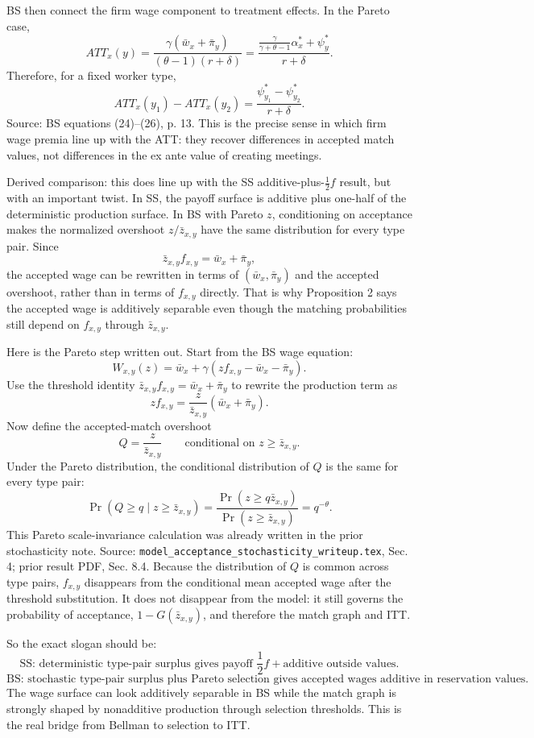 ﻿\documentclass[11pt]{article}
\newcommand{\1}{\mathbf{1}}
\begin{document}
BS then connect the firm wage component to treatment effects. In the Pareto
case,
\[
ATT_x(y)
=
\frac{\gamma(\bar w_x+\bar\pi_y)}{(\theta-1)(r+\delta)}
=
\frac{\frac{\gamma}{\gamma+\theta-1}\alpha^*_x+\psi^*_y}{r+\delta}.
\]
Therefore, for a fixed worker type,
\[
ATT_x(y_1)-ATT_x(y_2)
=
\frac{\psi^*_{y_1}-\psi^*_{y_2}}{r+\delta}.
\]
Source: BS equations (24)--(26), p. 13. This is the precise sense in which
firm wage premia line up with the ATT: they recover differences in accepted
match values, not differences in the ex ante value of creating meetings.

Derived comparison: this does line up with the SS additive-plus-$\frac12 f$ result, but with an
important twist. In SS, the payoff surface is additive plus one-half of the
deterministic production surface. In BS with Pareto $z$, conditioning on
acceptance makes the normalized overshoot $z/\bar z_{x,y}$ have the same
distribution for every type pair. Since
\[
\bar z_{x,y}f_{x,y}=\bar w_x+\bar\pi_y,
\]
the accepted wage can be rewritten in terms of $(\bar w_x,\bar\pi_y)$ and the
accepted overshoot, rather than in terms of $f_{x,y}$ directly. That is why
Proposition 2 says the accepted wage is additively separable even though the
matching probabilities still depend on $f_{x,y}$ through $\bar z_{x,y}$.

Here is the Pareto step written out. Start from the BS wage equation:
\[
W_{x,y}(z)
=
\bar w_x+\gamma(zf_{x,y}-\bar w_x-\bar\pi_y).
\]
Use the threshold identity $\bar z_{x,y}f_{x,y}=\bar w_x+\bar\pi_y$ to rewrite
the production term as
\[
zf_{x,y}
=
\frac{z}{\bar z_{x,y}}(\bar w_x+\bar\pi_y).
\]
Now define the accepted-match overshoot
\[
Q=\frac{z}{\bar z_{x,y}}
\qquad\text{conditional on }z\geq \bar z_{x,y}.
\]
Under the Pareto distribution, the conditional distribution of $Q$ is the same for
every type pair:
\[
\Pr(Q\geq q\mid z\geq \bar z_{x,y})
=
\frac{\Pr(z\geq q\bar z_{x,y})}{\Pr(z\geq \bar z_{x,y})}
=
q^{-\theta}.
\]
This Pareto scale-invariance calculation was already written in the prior
stochasticity note. Source: \texttt{model\_acceptance\_stochasticity\_writeup.tex},
Sec. 4; prior result PDF, Sec. 8.4. Because the distribution of $Q$ is common
across type pairs, $f_{x,y}$ disappears from the conditional mean accepted wage
after the threshold substitution. It does not disappear from the model: it still
governs the probability of acceptance, $1-G(\bar z_{x,y})$, and therefore the
match graph and ITT.

So the exact slogan should be:
\[
\text{SS: deterministic type-pair surplus gives payoff } 
\frac12 f+\text{additive outside values.}
\]
\[
\text{BS: stochastic type-pair surplus plus Pareto selection gives accepted wages }
\text{additive in reservation values.}
\]
The wage surface can look additively separable in BS while the match graph is
strongly shaped by nonadditive production through selection thresholds. This is
the real bridge from Bellman to selection to ITT.
\end{document}
